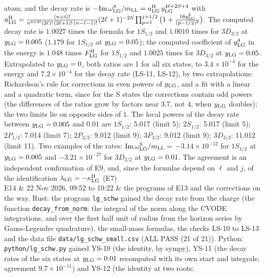 \documentclass[
  10pt,
]{article}
\begin{document}
\begin{longtable}[]
atom; and the decay rate is
\(-{\rm Im}\,\omega^{\rm S}_{\rm LG}/m_{\rm LL}=a^{\rm H}_{\rm LG}\,y_{\rm LG}^{4\ell+2S+4}\)
with
\(a^{\rm H}_{\rm LG}=\frac{(n+\ell)!}{n^{4+2\ell}(2\ell)!\,(2\ell+1)!\,(n-\ell-1)!}(2\ell+1)^{-2S}\prod_{p=1}^{j+1/2}\big(1+\tfrac{16y_{\rm LG}^2}{(p-1/2)^2}\big)\).
The computed decay rate is \(1.0027\) times the formula for \(1S_{1/2}\)
and \(1.0010\) times for \(3D_{3/2}\) at \(y_{\rm LG}=0.005\) (\(1.179\)
for \(1S_{1/2}\) at \(y_{\rm LG}=0.05\)); the computed coefficient of
\(y_{\rm LG}^4\) in the energy is \(1.048\) times \(F^{\rm H}_{\rm LG}\)
for \(1S_{1/2}\) and \(1.0025\) times for \(3D_{3/2}\) at
\(y_{\rm LG}=0.05\). Extrapolated to \(y_{\rm LG}=0\), both ratios are 1
for all six states, to \(3.4\times10^{-4}\) for the energy and
\(7.2\times10^{-4}\) for the decay rate (LS-11, LS-12), by two
extrapolations: Richardson's rule for corrections in even powers of
\(y_{\rm LG}\), and a fit with a linear and a quadratic term, since for
the S states the corrections contain odd powers (the differences of the
ratios grow by factors near 3.7, not 4, when \(y_{\rm LG}\) doubles);
the two limits lie on opposite sides of 1. The local powers of the decay
rate between \(y_{\rm LG}=0.005\) and \(0.01\) are \(1S_{1/2}\): 5.017
(limit 5); \(2S_{1/2}\): 5.017 (limit 5); \(2P_{1/2}\): 7.014 (limit 7);
\(2P_{3/2}\): 9.012 (limit 9); \(3P_{3/2}\): 9.012 (limit 9);
\(3D_{3/2}\): 11.012 (limit 11). Two examples of the rates:
\({\rm Im}\,\omega^{\rm S}_{\rm LG}/m_{\rm LL}=\)
\(-3.14\times10^{-12}\) for \(1S_{1/2}\) at \(y_{\rm LG}=0.005\) and
\(-3.21\times10^{-27}\) for \(3D_{3/2}\) at \(y_{\rm LG}=0.01\). The
agreement is an independent confirmation of E9, and, since the formulas
depend on \(\ell\) and \(j\), of the identification
\(\lambda_{\rm LG}=-\kappa^{\rm H}_{\rm LG}\) (E7) \\
E14 & 22 Nov 2026, 09:52 to 10:22 & the programs of E13 and the
corrections on the way. Rust: the program \texttt{lg\_schw} gained the
decay rate from the charge (the function \texttt{decay\_from\_norm}: the
integral of the norm along the CVODE integrations, and over the first
half unit of radius from the horizon series by Gauss-Legendre
quadrature), the small-mass formulas, the checks LS-10 to LS-13 and the
data file \texttt{data/lg\_schw\_small.csv} (ALL PASS (21 of 21)).
Python: \texttt{python/lg\_schw.py} gained YS-10 (the identity, by
sympy), YS-11 (the decay rates of the six states at \(y_{\rm LG}=0.01\)
recomputed with its own start and integrals; agreement
\(9.7\times10^{-11}\)) and YS-12 (the identity at two roots;

\end{longtable}
\end{document}
